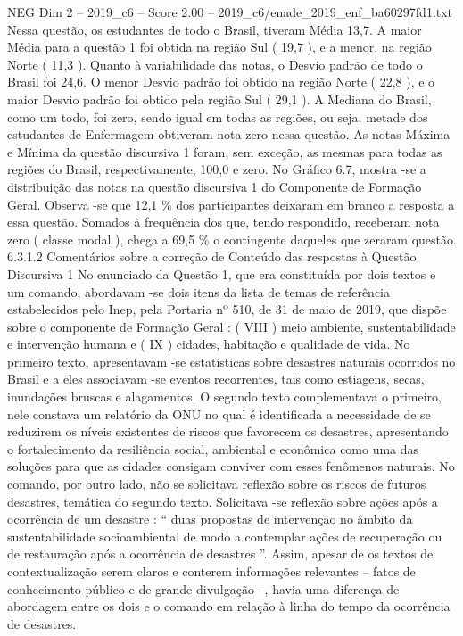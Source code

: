 \begin{textsample}{NEG Dim 2 – 2019\_c6 – Score 2.00 – 2019\_c6/enade\_2019\_enf\_ba60297fd1.txt}
Nessa questão, os estudantes de todo o Brasil, tiveram Média 13,7.
A maior Média para a questão 1 foi obtida na região Sul ( 19,7 ), e a menor, na região Norte ( 11,3 ).
Quanto à variabilidade das notas, o Desvio padrão de todo o Brasil foi 24,6.
O menor Desvio padrão foi obtido na região Norte ( 22,8 ), e o maior Desvio padrão foi obtido pela região Sul ( 29,1 ).
A Mediana do Brasil, como um todo, foi zero, sendo igual em todas as regiões, ou seja, metade dos estudantes de Enfermagem obtiveram nota zero nessa questão.
As notas Máxima e Mínima da questão discursiva 1 foram, sem exceção, as mesmas para todas as regiões do Brasil, respectivamente, 100,0 e zero.
No Gráfico 6.7, mostra -se a distribuição das notas na questão discursiva 1 do Componente de Formação Geral.
Observa -se que 12,1 \% dos participantes deixaram em branco a resposta a essa questão.
Somados à frequência dos que, tendo respondido, receberam nota zero ( classe modal ), chega a 69,5 \% o contingente daqueles que zeraram questão. 6.3.1.2 Comentários sobre a correção de Conteúdo das respostas à Questão Discursiva 1 No enunciado da Questão 1, que era constituída por dois textos e um comando, abordavam -se dois itens da lista de temas de referência estabelecidos pelo Inep, pela Portaria nº 510, de 31 de maio de 2019, que dispõe sobre o componente de Formação Geral : ( VIII ) meio ambiente, sustentabilidade e intervenção humana e ( IX ) cidades, habitação e qualidade de vida.
No primeiro texto, apresentavam -se estatísticas sobre desastres naturais ocorridos no Brasil e a eles associavam -se eventos recorrentes, tais como estiagens, secas, inundações bruscas e alagamentos.
O segundo texto complementava o primeiro, nele constava um relatório da ONU no qual é identificada a necessidade de se reduzirem os níveis existentes de riscos que favorecem os desastres, apresentando o fortalecimento da resiliência social, ambiental e econômica como uma das soluções para que as cidades consigam conviver com esses fenômenos naturais.
No comando, por outro lado, não se solicitava reflexão sobre os riscos de futuros desastres, temática do segundo texto.
Solicitava -se reflexão sobre ações após a ocorrência de um desastre : “ duas propostas de intervenção no âmbito da sustentabilidade socioambiental de modo a contemplar ações de recuperação ou de restauração após a ocorrência de desastres ”.
Assim, apesar de os textos de contextualização serem claros e conterem informações relevantes – fatos de conhecimento público e de grande divulgação –, havia uma diferença de abordagem entre os dois e o comando em relação à linha do tempo da ocorrência de desastres.

\end{textsample}
